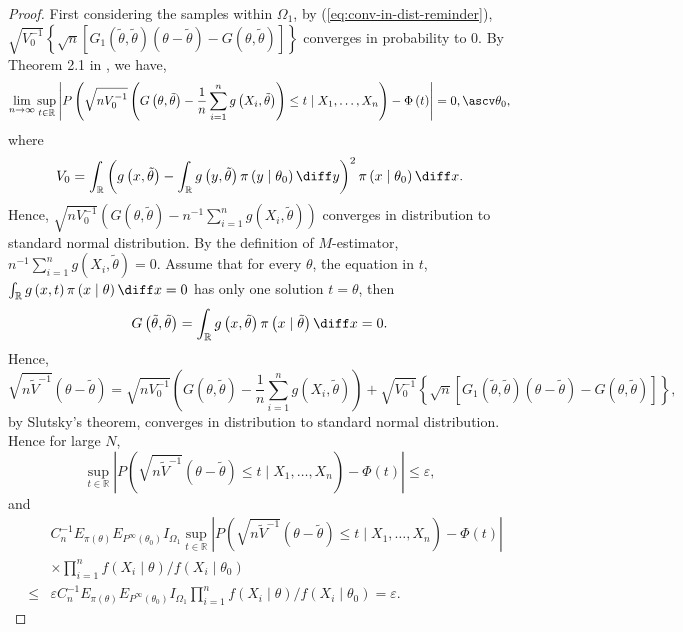 \begin{proof}
First considering the samples within $\Omega_{1}$, by (\ref{eq:conv-in-dist-reminder}),
$\sqrt{V_{0}^{-1}}\left\{ \sqrt{n}\left[G_{1}\left(\tilde{\theta},\tilde{\theta}\right)\left(\theta-\tilde{\theta}\right)-G\left(\theta,\tilde{\theta}\right)\right]\right\} $
converges in probability to 0. By Theorem 2.1 in \citet{rivoirard2012bernstein},
we have, 
\begin{equation}
\lim_{n\rightarrow\infty}\sup_{t\in\mathbb{R}}\left|P\left(\sqrt{nV_{0}^{-1}}\left(G\left(\theta,\tilde{\theta}\right)-\frac{1}{n}\sum_{i=1}^{n}g\left(X_{i},\tilde{\theta}\right)\right)\le t\mid X_{1},\ldots,X_{n}\right)-\Phi\left(t\right)\right|=0,\ascv\theta_{0},\label{eq:conv-in-dist-est-eq}
\end{equation}
where 
\[
V_{0}=\int_{\mathbb{R}}\left(g\left(x,\tilde{\theta}\right)-\int_{\mathbb{R}}g\left(y,\tilde{\theta}\right)\pi\left(y\mid\theta_{0}\right)\diff y\right)^{2}\pi\left(x\mid\theta_{0}\right)\diff x.
\]
Hence, $\sqrt{nV_{0}^{-1}}\left(G\left(\theta,\tilde{\theta}\right)-n^{-1}\sum_{i=1}^{n}g\left(X_{i},\tilde{\theta}\right)\right)$
converges in distribution to standard normal distribution. By the
definition of $M$-estimator, $n^{-1}\sum_{i=1}^{n}g\left(X_{i},\tilde{\theta}\right)=0$.
Assume that for every $\theta$, the equation in $t$, $\int_{\mathbb{R}}g\left(x,t\right)\pi\left(x\mid\theta\right)\diff x=0$
has only one solution $t=\theta$, then 
\[
G\left(\tilde{\theta},\tilde{\theta}\right)=\int_{\mathbb{R}}g\left(x,\tilde{\theta}\right)\pi\left(x\mid\tilde{\theta}\right)\diff x=0.
\]
Hence,
\[
\sqrt{n\tilde{V}^{-1}}\left(\theta-\tilde{\theta}\right)=\sqrt{nV_{0}^{-1}}\left(G\left(\theta,\tilde{\theta}\right)-\frac{1}{n}\sum_{i=1}^{n}g\left(X_{i},\tilde{\theta}\right)\right)+\sqrt{V_{0}^{-1}}\left\{ \sqrt{n}\left[G_{1}\left(\tilde{\theta},\tilde{\theta}\right)\left(\theta-\tilde{\theta}\right)-G\left(\theta,\tilde{\theta}\right)\right]\right\} ,
\]
by Slutsky's theorem, converges in distribution to standard normal
distribution. Hence for large $N$, 
\[
\sup_{t\in\mathbb{R}}\left|P\left(\sqrt{n\tilde{V}^{-1}}\left(\theta-\tilde{\theta}\right)\le t\mid X_{1},\ldots,X_{n}\right)-\Phi\left(t\right)\right|\le\varepsilon,
\]
and 
\begin{eqnarray}
 &  & C_{n}^{-1}E_{\pi\left(\theta\right)}E_{P^{\infty}\left(\theta_{0}\right)}I_{\Omega_{1}}\sup_{t\in\mathbb{R}}\left|P\left(\sqrt{n\tilde{V}^{-1}}\left(\theta-\tilde{\theta}\right)\le t\mid X_{1},\ldots,X_{n}\right)-\Phi\left(t\right)\right| \\
 &  & \times \prod_{i=1}^{n}f\left(X_{i}\mid\theta\right)/f\left(X_{i}\mid\theta_{0}\right)\nonumber \\
 & \le & \varepsilon C_{n}^{-1}E_{\pi\left(\theta\right)}E_{P^{\infty}\left(\theta_{0}\right)}I_{\Omega_{1}}\prod_{i=1}^{n}f\left(X_{i}\mid\theta\right)/f\left(X_{i}\mid\theta_{0}\right)=\varepsilon.\label{eq:conv-with-omega1}
\end{eqnarray}



\end{proof}
